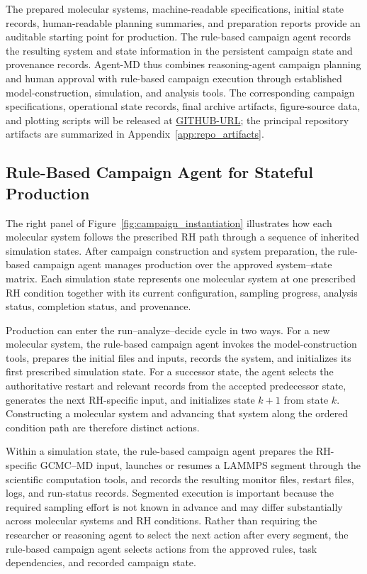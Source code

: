 The prepared molecular systems, machine-readable specifications, initial state records, human-readable planning summaries, and preparation reports provide an auditable starting point for production. The rule-based campaign agent records the resulting system and state information in the persistent campaign state and provenance records. Agent-MD thus combines reasoning-agent campaign planning and human approval with rule-based campaign execution through established model-construction, simulation, and analysis tools. The corresponding campaign specifications, operational state records, final archive artifacts, figure-source data, and plotting scripts will be released at \url{GITHUB-URL}; the principal repository artifacts are summarized in Appendix~\ref{app:repo_artifacts}.

\subsection{Rule-Based Campaign Agent for Stateful Production}

The right panel of Figure~\ref{fig:campaign_instantiation} illustrates how each molecular system follows the prescribed RH path through a sequence of inherited simulation states. After campaign construction and system preparation, the rule-based campaign agent manages production over the approved system--state matrix. Each simulation state represents one molecular system at one prescribed RH condition together with its current configuration, sampling progress, analysis status, completion status, and provenance.

Production can enter the run--analyze--decide cycle in two ways. For a new molecular system, the rule-based campaign agent invokes the model-construction tools, prepares the initial files and inputs, records the system, and initializes its first prescribed simulation state. For a successor state, the agent selects the authoritative restart and relevant records from the accepted predecessor state, generates the next RH-specific input, and initializes state $k+1$ from state $k$. Constructing a molecular system and advancing that system along the ordered condition path are therefore distinct actions.

Within a simulation state, the rule-based campaign agent prepares the RH-specific GCMC--MD input, launches or resumes a LAMMPS segment through the scientific computation tools, and records the resulting monitor files, restart files, logs, and run-status records. Segmented execution is important because the required sampling effort is not known in advance and may differ substantially across molecular systems and RH conditions. Rather than requiring the researcher or reasoning agent to select the next action after every segment, the rule-based campaign agent selects actions from the approved rules, task dependencies, and recorded campaign state.

